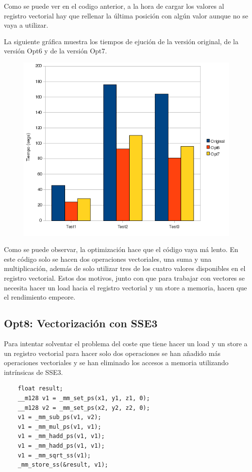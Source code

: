 Como se puede ver en el codigo anterior, a la hora de cargar los valores al
registro vectorial hay que rellenar la \'{u}ltima posici\'{o}n con alg\'{u}n
valor aunque no se vaya a utilizar.

La siguiente gr\'{a}fica muestra los tiempos de ejuci\'{o}n de la versi\'{o}n
original, de la versi\'{o}n Opt6 y de la versi\'{o}n Opt7.

\begin{figure}[ht]
   \centering
   \includegraphics[keepaspectratio=true,width=.5\textwidth]{figures/opt7-perf}
\end{figure}

Como se puede observar, la optimizaci\'{o}n hace que el c\'{o}digo vaya m\'{a}
lento. En este c\'{o}digo solo se hacen dos operaciones vectoriales, una suma y
una multiplicaci\'{o}n, adem\'{a}s de solo utilizar tres de los cuatro valores
disponibles en el registro vectorial. Estos dos motivos, junto con que para
trabajar con vectores se necesita hacer un load hacia el registro vectorial y
un store a memoria, hacen que el rendimiento empeore.

\subsection{Opt8: Vectorizaci\'{o}n con SSE3}

Para intentar solventar el problema del coste que tiene hacer un load y un store
a un registro vectorial para hacer solo dos operaciones se han a\~{n}adido
m\'{a}s operaciones vectoriales y se han eliminado los accesos a memoria
utilizando intr\'{i}nsicas de SSE3.

\begin{lstlisting}
    float result;
    __m128 v1 = _mm_set_ps(x1, y1, z1, 0);
    __m128 v2 = _mm_set_ps(x2, y2, z2, 0);
    v1 = _mm_sub_ps(v1, v2);
    v1 = _mm_mul_ps(v1, v1);
    v1 = _mm_hadd_ps(v1, v1);
    v1 = _mm_hadd_ps(v1, v1);
    v1 = _mm_sqrt_ss(v1);	
    _mm_store_ss(&result, v1);
\end{lstlisting}

